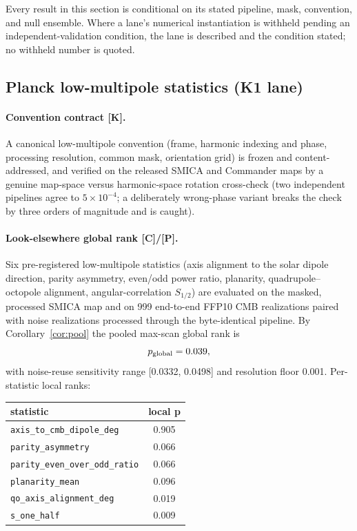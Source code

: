 \documentclass[10pt]{article}
\theoremstyle{definition}
\newcommand{\code}[1]{\texttt{\small #1}}
\newcommand{\tier}[1]{\textbf{[#1]}}
\begin{document}
Every result in this section is conditional on its stated pipeline,
mask, convention, and null ensemble. Where a lane's numerical
instantiation is withheld pending an independent-validation condition,
the lane is described and the condition stated; no withheld number is
quoted.

\subsection{Planck low-multipole statistics (K1 lane)}
\label{sec:k1}

\paragraph{Convention contract \tier{K}.}
A canonical low-multipole convention (frame, harmonic indexing and
phase, processing resolution, common mask, orientation grid) is frozen
and content-addressed, and verified on the released SMICA and
Commander maps by a genuine map-space versus harmonic-space rotation
cross-check (two independent pipelines agree to $5\times10^{-4}$;
a deliberately wrong-phase variant breaks the check by three orders of
magnitude and is caught).

\paragraph{Look-elsewhere global rank \tier{C}/\tier{P}.}
Six pre-registered low-multipole statistics (axis alignment to the
solar dipole direction, parity asymmetry, even/odd power ratio,
planarity, quadrupole--octopole alignment, angular-correlation
$S_{1/2}$) are evaluated on the masked, processed SMICA map and on 999
end-to-end FFP10 CMB realizations paired with noise realizations
processed through the byte-identical pipeline. By
Corollary~\ref{cor:pool} the pooled max-scan global rank is
\begin{equation}
p_{\rm global} = 0.039 ,
\end{equation}
with noise-reuse sensitivity range [0.0332, 0.0498] and
resolution floor 0.001. Per-statistic local ranks:

\begin{center}\small
\begin{tabular}{lc}
\toprule statistic & local p \\ \midrule
\code{axis\_to\_cmb\_dipole\_deg} & 0.905 \\
\code{parity\_asymmetry} & 0.066 \\
\code{parity\_even\_over\_odd\_ratio} & 0.066 \\
\code{planarity\_mean} & 0.096 \\
\code{qo\_axis\_alignment\_deg} & 0.019 \\
\code{s\_one\_half} & 0.009 \\ \bottomrule
\end{tabular}
\end{center}
\end{document}
